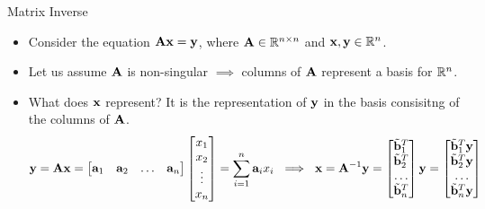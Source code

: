 \documentclass[aspectratio=169]{beamer}
\let\olditem\item
\renewcommand{\item}{\setlength{\itemsep}{\fill}\olditem}
\def\mf{\ensuremath\mathbf}
\def\mb{\ensuremath\mathbb}
\begin{document}
\begin{frame}[t]{Matrix Inverse}
\begin{itemize}
    \item Consider the equation $\mf{Ax} = \mf{y}$, where $\mf{A} \in \mb{R}^{n \times n}$ and $\mf{x}, \mf{y} \in \mb{R}^n$. 

    \item Let us assume $\mf{A}$ is non-singular $\implies$ columns of $\mf{A}$ represent a basis for $\mb{R}^n$.

    \item What does $\mf{x}$ represent? It is the representation of $\mf{y}$ in the basis consisitng of the columns of $\mf{A}$.
    \[ \mf{y} = \mf{Ax} = \begin{bmatrix*}\mf{a}_1 & \mf{a}_2 & \ldots & \mf{a}_n\end{bmatrix*}\begin{bmatrix*}x_1 \\ x_2 \\ \vdots \\ x_n\end{bmatrix*} = \sum_{i=1}^{n}\mf{a}_i x_i  \,\, \implies \,\, \mf{x} = \mf{A}^{-1}\mf{y} = \begin{bmatrix*}\tilde{\mf{b}}_1^T \\ \tilde{\mf{b}}_2^T \\ \ldots \\ \tilde{\mf{b}}_n^T\end{bmatrix*}\mf{y} = \begin{bmatrix*}\tilde{\mf{b}}_1^T\mf{y} \\ \tilde{\mf{b}}_2^T\mf{y} \\ \ldots \\ \tilde{\mf{b}}_n^T\mf{y}\end{bmatrix*} \]
\end{itemize}
\end{frame}
\end{document}

